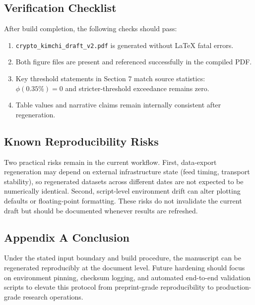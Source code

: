 \documentclass[11pt,a4paper]{article}
\begin{document}
\subsection{Verification Checklist}
After build completion, the following checks should pass:
\begin{enumerate}
    \item \texttt{crypto\_kimchi\_draft\_v2.pdf} is generated without LaTeX fatal errors.
    \item Both figure files are present and referenced successfully in the compiled PDF.
    \item Key threshold statements in Section 7 match source statistics:
    $\phi(0.35\%)=0$ and stricter-threshold exceedance remains zero.
    \item Table values and narrative claims remain internally consistent after regeneration.
\end{enumerate}

\subsection{Known Reproducibility Risks}
Two practical risks remain in the current workflow. First, data-export regeneration may depend on external infrastructure state (feed timing, transport stability), so regenerated datasets across different dates are not expected to be numerically identical. Second, script-level environment drift can alter plotting defaults or floating-point formatting. These risks do not invalidate the current draft but should be documented whenever results are refreshed.

\subsection{Appendix A Conclusion}
Under the stated input boundary and build procedure, the manuscript can be regenerated reproducibly at the document level. Future hardening should focus on environment pinning, checksum logging, and automated end-to-end validation scripts to elevate this protocol from preprint-grade reproducibility to production-grade research operations.
\end{document}
